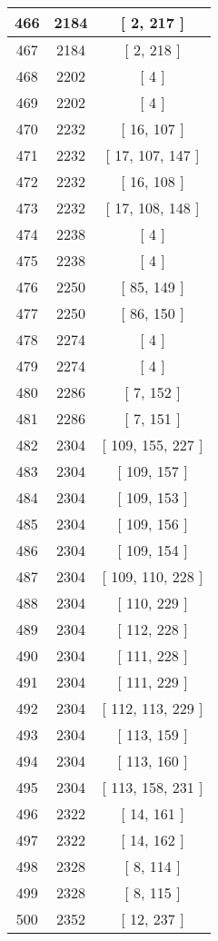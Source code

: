 \begin{center}
\begin{longtable}[H]{|| c c c ||}
\hline
466 & 2184 & [ 2, 217 ] \\ 
\hline
467 & 2184 & [ 2, 218 ] \\ 
\hline
468 & 2202 & [ 4 ] \\ 
\hline
469 & 2202 & [ 4 ] \\ 
\hline
470 & 2232 & [ 16, 107 ] \\ 
\hline
471 & 2232 & [ 17, 107, 147 ] \\ 
\hline
472 & 2232 & [ 16, 108 ] \\ 
\hline
473 & 2232 & [ 17, 108, 148 ] \\ 
\hline
474 & 2238 & [ 4 ] \\ 
\hline
475 & 2238 & [ 4 ] \\ 
\hline
476 & 2250 & [ 85, 149 ] \\ 
\hline
477 & 2250 & [ 86, 150 ] \\ 
\hline
478 & 2274 & [ 4 ] \\ 
\hline
479 & 2274 & [ 4 ] \\ 
\hline
480 & 2286 & [ 7, 152 ] \\ 
\hline
481 & 2286 & [ 7, 151 ] \\ 
\hline
482 & 2304 & [ 109, 155, 227 ] \\ 
\hline
483 & 2304 & [ 109, 157 ] \\ 
\hline
484 & 2304 & [ 109, 153 ] \\ 
\hline
485 & 2304 & [ 109, 156 ] \\ 
\hline
486 & 2304 & [ 109, 154 ] \\ 
\hline
487 & 2304 & [ 109, 110, 228 ] \\ 
\hline
488 & 2304 & [ 110, 229 ] \\ 
\hline
489 & 2304 & [ 112, 228 ] \\ 
\hline
490 & 2304 & [ 111, 228 ] \\ 
\hline
491 & 2304 & [ 111, 229 ] \\ 
\hline
492 & 2304 & [ 112, 113, 229 ] \\ 
\hline
493 & 2304 & [ 113, 159 ] \\ 
\hline
494 & 2304 & [ 113, 160 ] \\ 
\hline
495 & 2304 & [ 113, 158, 231 ] \\ 
\hline
496 & 2322 & [ 14, 161 ] \\ 
\hline
497 & 2322 & [ 14, 162 ] \\ 
\hline
498 & 2328 & [ 8, 114 ] \\ 
\hline
499 & 2328 & [ 8, 115 ] \\ 
\hline
500 & 2352 & [ 12, 237 ] \\ 

\end{longtable}
\end{center}
